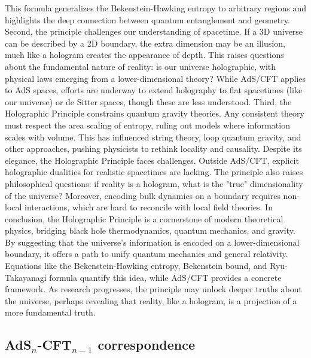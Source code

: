 This formula generalizes the Bekenstein-Hawking entropy to arbitrary regions and highlights the deep connection between quantum entanglement and geometry.
Second, the principle challenges our understanding of spacetime. If a 3D universe can be described by a 2D boundary, the extra dimension may be an illusion, much like a hologram creates the appearance of depth. This raises questions about the fundamental nature of reality: is our universe holographic, with physical laws emerging from a lower-dimensional theory? While AdS/CFT applies to AdS spaces, efforts are underway to extend holography to flat spacetimes (like our universe) or de Sitter spaces, though these are less understood.
Third, the Holographic Principle constrains quantum gravity theories. Any consistent theory must respect the area scaling of entropy, ruling out models where information scales with volume. This has influenced string theory, loop quantum gravity, and other approaches, pushing physicists to rethink locality and causality.
Despite its elegance, the Holographic Principle faces challenges. Outside AdS/CFT, explicit holographic dualities for realistic spacetimes are lacking. The principle also raises philosophical questions: if reality is a hologram, what is the "true" dimensionality of the universe? Moreover, encoding bulk dynamics on a boundary requires non-local interactions, which are hard to reconcile with local field theories.
In conclusion, the Holographic Principle is a cornerstone of modern theoretical physics, bridging black hole thermodynamics, quantum mechanics, and gravity. By suggesting that the universe’s information is encoded on a lower-dimensional boundary, it offers a path to unify quantum mechanics and general relativity. Equations like the Bekenstein-Hawking entropy, Bekenstein bound, and Ryu-Takayanagi formula quantify this idea, while AdS/CFT provides a concrete framework. As research progresses, the principle may unlock deeper truths about the universe, perhaps revealing that reality, like a hologram, is a projection of a more fundamental truth.


\subsection{AdS$_n$-CFT$_{n-1}$ correspondence}

